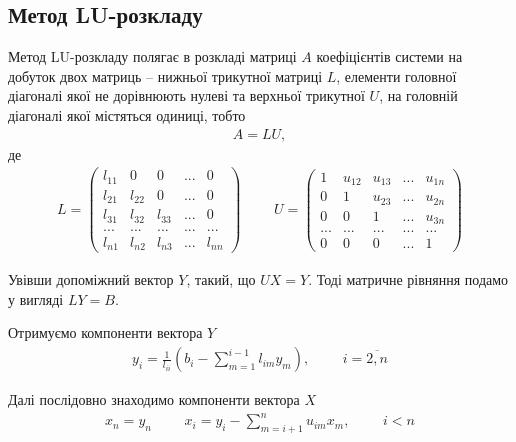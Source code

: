 \documentclass{article}
\begin{document}
\begin{large}
		\subsection*{Метод LU-розкладу}
		Метод LU-розкладу полягає в розкладі матриці $A$ коефіцієнтів системи на добуток двох матриць –
		нижньої трикутної матриці $L$, елементи головної діагоналі якої не дорівнюють
		нулеві та верхньої трикутної $U$, на головній діагоналі якої містяться одиниці,
		тобто
		\begin{gather}
			A=LU\nonumber,
		\end{gather}
		де
		\begin{gather}\nonumber
			L=\begin{pmatrix}
				l_{11} & 0 & 0 & ... & 0\\
				l_{21} & l_{22} & 0 & ... & 0\\
				l_{31} & l_{32} & l_{33} & ... & 0\\
				... & ... & ... & ... & ...\\
				l_{n1} & l_{n2} & l_{n3} & ... & l_{nn}
			\end{pmatrix}
			\hspace{28pt}
			U=\begin{pmatrix}
				1 & u_{12} & u_{13} & ... & u_{1n}\\
				0 & 1 & u_{23} & ... & u_{2n}\\
				0 & 0 & 1 & ... & u_{3n}\\
				... & ... & ... & ... & ...\\
				0 & 0 & 0 & ... & 1
			\end{pmatrix}\nonumber
		\end{gather}
	
		Увівши допоміжний вектор $Y$, такий, що $UX=Y$.
		Тоді матричне рівняння подамо у вигляді $LY=B$.
		
		Отримуємо компоненти вектора $Y$
		\begin{gather}
			y_i=\frac{1}{l_{ii}}(b_i-\sum_{m=1}^{i-1}l_{im}y_m), \hspace{28pt} i=\overline{2,n}\nonumber
		\end{gather}
	
		Далі послідовно знаходимо компоненти
		вектора $X$
		\begin{gather}
			x_n=y_n\hspace{28pt}x_i=y_i-\sum_{m=i+1}^{n}u_{im}x_m,\hspace{28pt}i<n\nonumber
		\end{gather}
	

\end{large}
\end{document}
